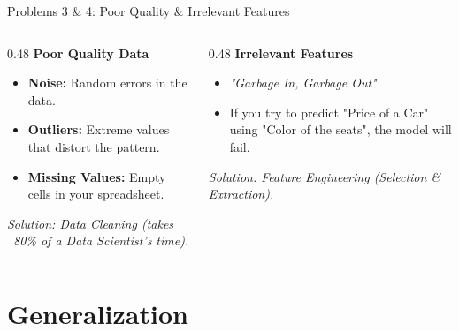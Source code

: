 \begin{frame}{Problems 3 \& 4: Poor Quality \& Irrelevant Features}
    \begin{columns}[T]
        \begin{column}{0.48\textwidth}
            \textbf{Poor Quality Data}
            \begin{itemize}
                \item \textbf{Noise:} Random errors in the data.
                \item \textbf{Outliers:} Extreme values that distort the pattern.
                \item \textbf{Missing Values:} Empty cells in your spreadsheet.
            \end{itemize}
            \vspace{0.5em}
            \textit{Solution: Data Cleaning (takes ~80\% of a Data Scientist's time).}
        \end{column}
        \begin{column}{0.48\textwidth}
            \textbf{Irrelevant Features}
            \begin{itemize}
                \item \textit{"Garbage In, Garbage Out"}
                \item If you try to predict "Price of a Car" using "Color of the seats", the model will fail.
            \end{itemize}
            \vspace{0.5em}
            \textit{Solution: Feature Engineering (Selection \& Extraction).}
        \end{column}
    \end{columns}
\end{frame}

\section{Generalization}
